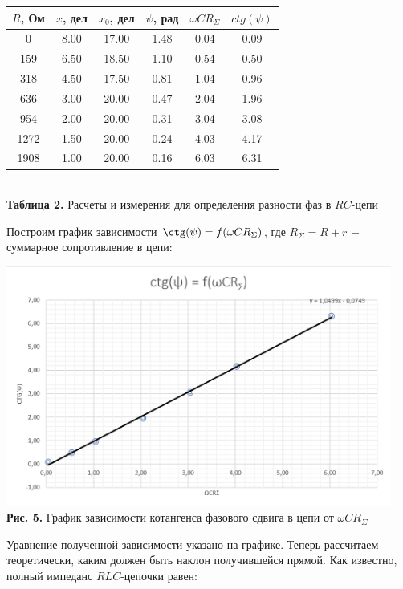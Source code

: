 \documentclass[a4paper,12pt]{article} %
\begin{document}
\begin{center}
\begin{tabular}{|c|c|c|c|c|c|}\hline
$ R $, Ом & $ x $, дел & $ x_{0} $, дел & $ \psi $, рад & $ \omega CR_{\Sigma} $ & $ ctg(\psi) $\\\hline
0 & 8.00 & 17.00 & 1.48 & 0.04 & 0.09 \\\hline
159 & 6.50 & 18.50 & 1.10 & 0.54 & 0.50 \\\hline
318 & 4.50 & 17.50 & 0.81 & 1.04 & 0.96 \\\hline
636 & 3.00 & 20.00 & 0.47 & 2.04 & 1.96 \\\hline
954 & 2.00 & 20.00 & 0.31 & 3.04 & 3.08 \\\hline
1272 & 1.50 & 20.00 & 0.24 & 4.03 & 4.17 \\\hline
1908 & 1.00 & 20.00 & 0.16 & 6.03 & 6.31 \\\hline
\end{tabular} \\
\hfill \break \textbf {Таблица 2.} Расчеты и измерения для определения разности фаз в $RC$-цепи\\
\end{center}

\hfill \break Построим график зависимости $\ctg(\psi) = f(\omega CR_{\Sigma})$, где $R_{\Sigma} = R + r$ $-$ суммарное сопротивление в цепи:

\begin{center}
\includegraphics[width=0.95\textwidth]{3.2.1_5.png}\\
\textbf{Рис. 5.} График зависимости котангенса фазового сдвига в цепи от $\omega CR_{\Sigma}$ \\
\end{center}

\hfill \break Уравнение полученной зависимости указано на графике. Теперь рассчитаем теоретически, каким должен быть наклон получившейся прямой. Как известно, полный импеданс $RLC$-цепочки равен:
\end{document}
